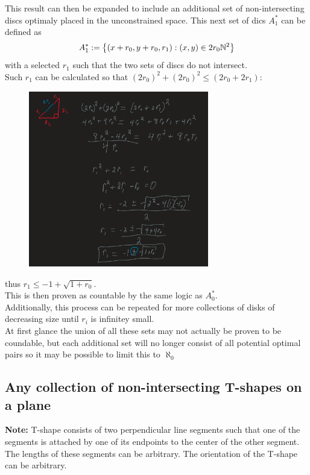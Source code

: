 \documentclass[]{article}
\newcommand{\N}{\mathbb{N}}
\begin{document}
\newpage
This result can then be expanded to include an additional set of non-intersecting discs 
optimaly placed in the unconstrained space. 
This next set of dics $A_1^*$ can be defined as
\begin{displaymath}
	A_1^* := \qty{(x + r_0, y + r_0, r_1) : (x,y) \in 2 r_0 \N^2}
\end{displaymath}
with a selected $r_1$ such that the two sets of discs do not intersect.\\
Such $r_1$ can be calculated so that $(2r_0)^2 + (2r_0)^2 \leq (2r_0 + 2 r_1)$:
\begin{figure}[h]
	\centering
	\includegraphics[width=0.7\textwidth]{fig/pblm4b_1.png}
\end{figure}
thus $r_1 \leq -1 + \sqrt{1 + r_0}$.\\
This is then proven as countable by the same logic as $A_0^*$.\\
Additionally, this process can be repeated for more collections of disks of decreasing size 
until $r_i$ is infinitey small.\\
At first glance the union of all these sets may not actually be proven to be coundable, 
but each additional set will no longer consist of all potential optimal pairs so it 
may be possible to limit this to $\aleph_0$

\newpage
\subsection{Any collection of non-intersecting T-shapes on a plane}
\textbf{Note:} T-shape consists of two perpendicular line segments such that 
one of the segments is attached by one of its endpoints to the center of the other segment. 
The lengths of these segments can be arbitrary. The orientation of the T-shape can be arbitrary.\\
\end{document}
